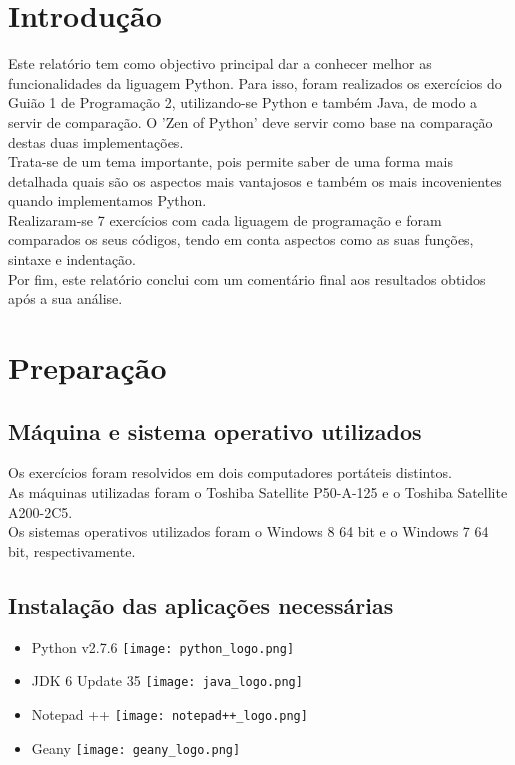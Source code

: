 \documentclass[a4paper]{report}
\begin{document}
\chapter{Introdução}
\label{introducao}

Este relatório tem como objectivo principal dar a conhecer melhor as funcionalidades da liguagem Python. Para isso, foram realizados os exercícios do Guião 1 de Programação 2, utilizando-se Python e também Java, de modo a servir de comparação. O 'Zen of Python' deve servir como base na comparação destas duas implementações.
\\
Trata-se de um tema importante, pois permite saber de uma forma mais detalhada quais são os aspectos mais vantajosos e também os mais incovenientes quando implementamos Python.
\\
Realizaram-se 7 exercícios com cada liguagem de programação e foram comparados os seus códigos, tendo em conta aspectos como as suas funções, sintaxe e indentação.
\\
Por fim, este relatório conclui com um comentário final aos resultados obtidos após a sua análise.

\chapter{Preparação}
\label{preparacao}

\section{Máquina e sistema operativo utilizados}
\label{machines}
Os exercícios foram resolvidos em dois computadores portáteis distintos.
\\As máquinas utilizadas foram o Toshiba Satellite P50-A-125 e o Toshiba Satellite A200-2C5.
\\Os sistemas operativos utilizados foram o Windows 8 64 bit e o Windows 7 64 bit, respectivamente.

\section{Instalação das aplicações necessárias}
\label{instalaraplicacoes}

\begin{itemize}
 \item Python\cite{Python} v2.7.6 \texttt{[image: python\_logo.png]}
 \item JDK\cite{JDK} 6 Update 35 \texttt{[image: java\_logo.png]}
 \item Notepad ++ \texttt{[image: notepad++\_logo.png]}
 \item Geany \texttt{[image: geany\_logo.png]}
\end{itemize}
\end{document}
